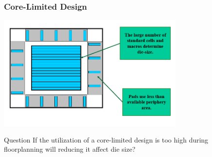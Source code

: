 \documentclass[compress]{beamer}
\begin{document}
\begin{frame}
	\frametitle{Core-Limited Design}
		\begin{center}
			\includegraphics[width=0.7\textwidth]{Core-Limited}
		\end{center}
	\begin{alertblock}{Question}
		If the utilization of a core-limited design is too high
		during floorplanning will reducing it affect die size?
	\end{alertblock}
\end{frame}
\end{document}

